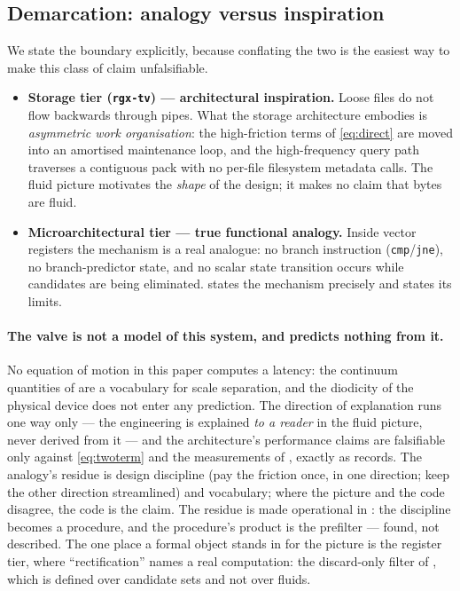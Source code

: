 \documentclass[11pt,letterpaper]{article}
\begin{document}
\subsection{Demarcation: analogy versus inspiration}
\label{sec:demarcation}
We state the boundary explicitly, because conflating the two is the easiest
way to make this class of claim unfalsifiable.

\begin{itemize}[leftmargin=*,itemsep=1pt]
\item \textbf{Storage tier (\texttt{rgx-tv}) --- architectural inspiration.}
Loose files do not flow backwards through pipes. What the storage
architecture embodies is \emph{asymmetric work organisation}: the
high-friction terms of \eqref{eq:direct} are moved into an amortised
maintenance loop, and the high-frequency query path traverses a contiguous
pack with no per-file filesystem metadata calls. The fluid picture motivates the
\emph{shape} of the design; it makes no claim that bytes are fluid.
\item \textbf{Microarchitectural tier --- true functional analogy.} Inside
vector registers the mechanism is a real analogue: no branch instruction
(\texttt{cmp}/\texttt{jne}), no branch-predictor state, and no scalar state
transition occurs while candidates are being eliminated.
 states the mechanism precisely and 
states its limits.
\end{itemize}

\paragraph{The valve is not a model of this system, and predicts nothing
from it.}
No equation of motion in this paper computes a latency: the continuum
quantities of  are a vocabulary for scale separation, and
the diodicity of the physical device does not enter any prediction. The
direction of explanation runs one way only --- the engineering is explained
\emph{to a reader} in the fluid picture, never derived from it --- and the
architecture's performance claims are falsifiable only against
\eqref{eq:twoterm} and the measurements of , exactly as
 records. The analogy's residue is design discipline
(pay the friction once, in one direction; keep the other direction
streamlined) and vocabulary; where the picture and the code disagree, the
code is the claim. The residue is made operational in :
the discipline becomes a procedure, and the procedure's product is the
prefilter --- found, not described. The one place a formal object stands
in for the picture is the register tier, where ``rectification'' names a real computation:
the discard-only filter of , which is defined
over candidate sets and not over fluids.
\end{document}
